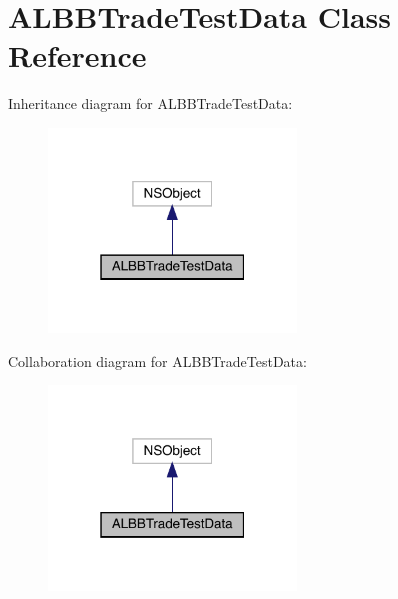 \hypertarget{interface_a_l_b_b_trade_test_data}{}\section{A\+L\+B\+B\+Trade\+Test\+Data Class Reference}
\label{interface_a_l_b_b_trade_test_data}


Inheritance diagram for A\+L\+B\+B\+Trade\+Test\+Data\+:\nopagebreak
\begin{figure}[H]
\begin{center}
\leavevmode
\includegraphics[width=187pt]{interface_a_l_b_b_trade_test_data__inherit__graph}
\end{center}
\end{figure}


Collaboration diagram for A\+L\+B\+B\+Trade\+Test\+Data\+:\nopagebreak
\begin{figure}[H]
\begin{center}
\leavevmode
\includegraphics[width=187pt]{interface_a_l_b_b_trade_test_data__coll__graph}
\end{center}
\end{figure}

